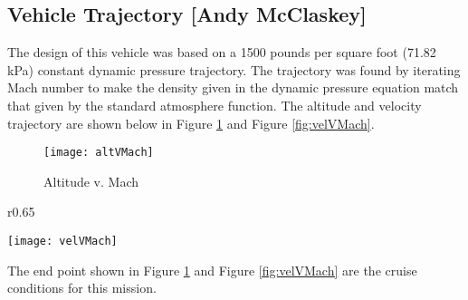 \subsection{Vehicle Trajectory [Andy McClaskey]}
The design of this vehicle was based on a 1500 pounds per square foot (71.82 kPa) constant dynamic pressure trajectory. The trajectory was found by iterating Mach number to make the density given in the dynamic pressure equation match that given by the standard atmosphere function. The altitude and velocity trajectory are shown below in Figure \ref{fig:altVMach} and Figure \ref{fig:velVMach}.

\begin{figure}[H]
\begin{center}
\texttt{[image: altVMach]}
\caption{Altitude v. Mach}
\label{fig:altVMach}
\end{center}
\end{figure}

\begin{wrapfigure}{r}{0.65\textwidth}
\begin{center}
\texttt{[image: velVMach]}
\caption{Velocity v. Mach}
\label{fig:velVMach}
\end{center}
\end{wrapfigure}

The end point shown in Figure \ref{fig:altVMach} and Figure \ref{fig:velVMach} are the cruise conditions for this mission.